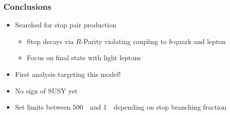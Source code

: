 \documentclass[10pt, svgnames]{beamer}
\begin{document}
\begin{frame}
  \frametitle{Conclusions}
  \begin{itemize}
    \item Searched for stop pair production
      \begin{itemize}
        \item Stop decays via $R$-Parity violating coupling to $b$-quark and lepton
        \item Focus on final state with light leptons
      \end{itemize}
    \item First analysis targeting this model!
    \item No sign of SUSY yet 
    \item Set limits between 500~\GeV\ and 1~\TeV\ depending on stop branching
      fraction
  \end{itemize}
  \vspace{1ex}
\end{frame}
\end{document}
